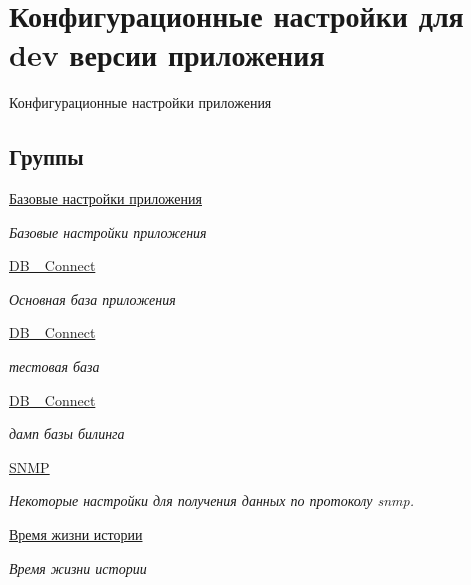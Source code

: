 \hypertarget{group__config}{\section{Конфигурационные настройки для dev версии приложения}
\label{group__config}
}


Конфигурационные настройки приложения  


\subsection*{Группы}
\begin{DoxyCompactItemize}
\item 
\hyperlink{group__basic__config}{Базовые настройки приложения}
\begin{DoxyCompactList}\small\item\em Базовые настройки приложения \end{DoxyCompactList}\item 
\hyperlink{group___d_b__1}{D\-B\-\_ Connect}
\begin{DoxyCompactList}\small\item\em Основная база приложения \end{DoxyCompactList}\item 
\hyperlink{group___d_b__2}{D\-B\-\_ Connect}
\begin{DoxyCompactList}\small\item\em тестовая база \end{DoxyCompactList}\item 
\hyperlink{group___d_b__3}{D\-B\-\_ Connect}
\begin{DoxyCompactList}\small\item\em дамп базы билинга \end{DoxyCompactList}\item 
\hyperlink{group__snmp}{S\-N\-M\-P}
\begin{DoxyCompactList}\small\item\em Некоторые настройки для получения данных по протоколу snmp. \end{DoxyCompactList}\item 
\hyperlink{group__time__clean}{Время жизни истории}
\begin{DoxyCompactList}\small\item\em Время жизни истории \end{DoxyCompactList}\item 

\end{DoxyCompactItemize}

